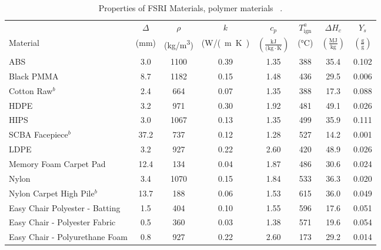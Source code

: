 \begin{table}[!h]
\caption[Properties of FSRI Materials, polymer materials]{Properties of FSRI Materials, polymer materials ~\cite{McKinnon:FSRI2023_Data}.}
\centering
\begin{tabular}{|p{6.5cm}|c|c|c|c|c|c|c|}
\hline
            & $\Delta$& $\rho$& $k$& $c_{p}$ &$T_{\mathrm{ign}}^{a}$&$\Delta H_{c}$& $Y_{s}$ \\
Material    & (mm) & (\unit{kg/m^3}) & (\unit{W/(m.K)} & $\mathrm{\left(\frac{kJ}{(kg\cdot K}\right)}$ & (\unit{\degreeCelsius})   & $\left(\mathrm{\frac{MJ}{kg}}\right)$ & $\mathrm{\left(\frac{g}{g}\right)}$ \\ \hline
\hline
ABS                                               & 3.0  & 1100 & 0.39 & 1.35 & 388 & 35.4 & 0.102 \\\hline
Black PMMA                                        & 8.7  & 1182 & 0.15 & 1.48 & 436 & 29.5 & 0.006 \\\hline
Cotton Raw$^{b}$                                  & 2.4  & 664  & 0.07 & 1.35 & 388 & 17.3 & 0.088 \\\hline
HDPE                                              & 3.2  & 971  & 0.30 & 1.92 & 481 & 49.1 & 0.026 \\\hline
HIPS                                              & 3.0  & 1067 & 0.13 & 1.35 & 499 & 35.9 & 0.111 \\\hline
SCBA Facepiece$^{b}$                              & 37.2 & 737  & 0.12 & 1.28 & 527 & 14.2 & 0.001 \\\hline
LDPE                                              & 3.2  & 927  & 0.22 & 2.60 & 420 & 48.9 & 0.026 \\\hline
Memory Foam Carpet Pad                            & 12.4 & 134  & 0.04 & 1.87 & 486 & 30.6 & 0.024 \\\hline
Nylon                                             & 3.4  & 1070 & 0.15 & 1.84 & 533 & 36.3 & 0.020 \\\hline
Nylon Carpet High Pile$^{b}$                      & 13.7 & 188  & 0.06 & 1.53 & 615 & 36.0 & 0.049 \\\hline
Easy Chair Polyester - Batting                    & 1.5  & 404  & 0.10 & 1.55 & 596 & 17.6 & 0.051 \\\hline
Easy Chair - Polyester Fabric                     & 0.5  & 360  & 0.03 & 1.38 & 571 & 19.6 & 0.054 \\\hline
Easy Chair - Polyurethane Foam                    & 0.8  & 927  & 0.22 & 2.60 & 173 & 29.2 & 0.014 \\\hline

\end{tabular}
\end{table}
